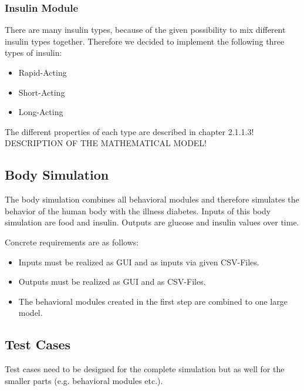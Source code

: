 \subsubsection{Insulin Module}
There are many insulin types, because of the given possibility to mix different 
insulin types together. Therefore we decided to implement the following three types of insulin:
\begin{itemize}
   \item Rapid-Acting
   \item Short-Acting
   \item Long-Acting
\end{itemize}
The different properties of each type are described in chapter 2.1.1.3!\\
DESCRIPTION OF THE MATHEMATICAL MODEL!\\

\subsection{Body Simulation}
The body simulation combines all behavioral modules and therefore simulates the
behavior of the human body with the illness diabetes.
Inputs of this body simulation are food and insulin.
Outputs are glucose and insulin values over time.

Concrete requirements are as follows:
\begin{itemize}
  \item Inputs must be realized as GUI and as inputs via given CSV-Files.
  \item Outputs must be realized as GUI and as CSV-Files.
  \item The behavioral modules created in the first step are combined to one
  large model.
\end{itemize} 

\subsection{Test Cases}
Test cases need to be designed for the complete simulation but as well for the
smaller parts (e.g. behavioral modules etc.).
